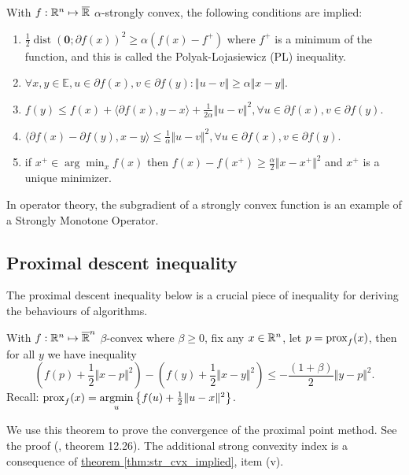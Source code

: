\documentclass[12pt]{article}
\begin{document}
        \begin{theorem}\label{thm:str_cvx_implied}
            With $f:\mathbb R^n \mapsto \overline {\mathbb R}$ $\alpha$-strongly convex, the following conditions are implied: 
            \begin{enumerate}
                \item $\frac{1}{2}\operatorname{dist}(\mathbf 0; \partial f(x))^2 \ge \alpha (f(x) - f^+)$ where $f^+$ is a minimum of the function, and this is called the Polyak-Lojasiewicz (PL) inequality.
                \item $\forall x, y\in \mathbb E, u\in \partial f(x), v\in \partial f(y): \Vert u - v\Vert\ge \alpha\Vert x - y\Vert$. 
                \item $f(y) \le f(x) + \langle \partial f(x), y - x\rangle + \frac{1}{2\alpha}\Vert u - v\Vert^2, \forall u\in  \partial f(x), v\in \partial f(y)$. 
                \item $\langle \partial f(x)-\partial f(y), x - y\rangle \le \frac{1}{\alpha}\Vert u - v\Vert^2, \forall u\in \partial f(x), v\in \partial f(y)$. 
                \item if $x^+\in \arg\min_{x}f(x)$ then $f(x) - f(x^+) \ge \frac{\alpha}{2}\Vert x - x^+\Vert^2$ and $x^+$ is a unique minimizer. 
            \end{enumerate}
        \end{theorem}
        \begin{remark}
            In operator theory, the subgradient of a strongly convex function is an example of a Strongly Monotone Operator. 
        \end{remark}
    
    \subsection{Proximal descent inequality}
        The proximal descent inequality below is a crucial piece of inequality for deriving the behaviours of algorithms. 
        \begin{theorem}\label{thm:ppm_descent_ineq}
            With $f: \mathbb R^n \mapsto \overline {\mathbb R}^n$ $\beta$-convex where $\beta \ge 0$, fix any $x \in \mathbb R^n$, let $p = \operatorname{prox}_f(x)$, then for all $y$ we have inequality 
            $$
                \left(f(p) + \frac{1}{2}\Vert x - p\Vert^2\right)
                - 
                \left(
                    f(y) + \frac{1}{2}\Vert x - y\Vert^2 
                \right)
                \le 
                - \frac{(1 + \beta)}{2}\Vert y - p\Vert^2. 
            $$
            Recall: $\operatorname{prox}_f(x) = \mathop{\rm argmin}\limits_{u}\left\lbrace f(u) + \frac{1}{2}\Vert u - x\Vert^2 \right\rbrace$. 
        \end{theorem}
        \begin{remark}
            We use this theorem to prove the convergence of the proximal point method. 
            See the proof (\cite{bauschke_convex_2017}, theorem 12.26). 
            The additional strong convexity index is a consequence of \hyperref[thm:str_cvx_implied]{theorem \ref*{thm:str_cvx_implied}}, item (v). 
        \end{remark}
        
\end{document}
